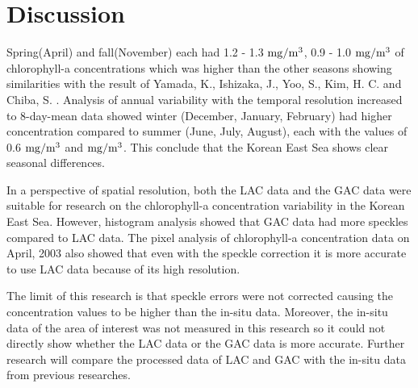 \section{Discussion}
Spring(April) and fall(November) each had 1.2 - 1.3 $\rm mg/m^3$, 0.9 - 1.0 $\rm mg/m^3$ of chlorophyll-a concentrations which was higher than the other seasons showing similarities with the result of Yamada, K., Ishizaka, J., Yoo, S., Kim, H. C. and Chiba, S. \cite{yamada2004seasonal}. Analysis of annual variability with the temporal resolution increased to 8-day-mean data showed winter (December, January, February) had higher concentration compared to summer (June, July, August), each with the values of 0.6 $\rm mg/m^3$ and $\rm mg/m^3$. This conclude that the Korean East Sea shows clear seasonal differences.

In a perspective of spatial resolution, both the LAC data and the GAC data were suitable for research on the chlorophyll-a concentration variability in the Korean East Sea. However, histogram analysis showed that GAC data had more speckles compared to LAC data. The pixel analysis of chlorophyll-a concentration data on April, 2003 also showed that even with the speckle correction it is more accurate to use LAC data because of its high resolution.

The limit of this research is that speckle errors were not corrected causing the concentration values to be higher than the in-situ data. Moreover, the in-situ data of the area of interest was not measured in this research so it could not directly show whether the LAC data or the GAC data is more accurate. Further research will compare the processed data of LAC and GAC with the in-situ data from previous researches.
